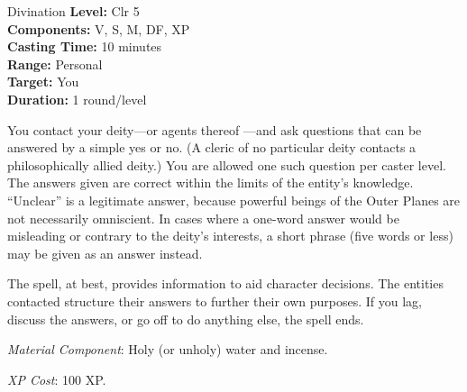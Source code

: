 {Divination}
{
	\textbf{Level:}
	Clr 5\\
	\textbf{Components:}
	V, S, M, DF, XP\\
	\textbf{Casting Time:}
	10 minutes\\
	\textbf{Range:}
	Personal\\
	\textbf{Target:}
	You\\
	\textbf{Duration:}
	1 round/level\\
}
{
	You contact your deity---or agents thereof ---and ask questions that can be answered by a simple yes or no. (A cleric of no particular deity contacts a philosophically allied deity.) You are allowed one such question per caster level. The answers given are correct within the limits of the entity's knowledge. ``Unclear'' is a legitimate answer, because powerful beings of the Outer Planes are not necessarily omniscient. In cases where a one-word answer would be misleading or contrary to the deity's interests, a short phrase (five words or less) may be given as an answer instead.

	The spell, at best, provides information to aid character decisions. The entities contacted structure their answers to further their own purposes. If you lag, discuss the answers, or go off to do anything else, the spell ends.

	\textit{Material Component}:
	Holy (or unholy) water and incense.

	\textit{XP Cost}:
	100 XP.

}
